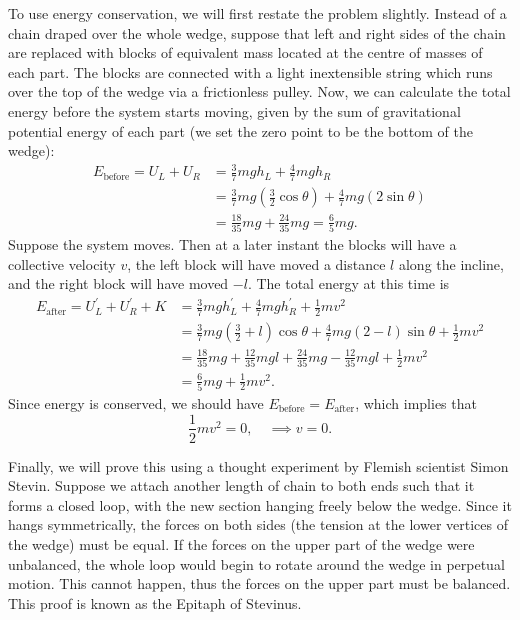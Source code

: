 \documentclass[../classical_mechanics.tex]{subfiles}
\begin{document}
\begin{example}
            To use energy conservation, we will first restate the problem slightly.
            Instead of a chain draped over the whole wedge, suppose that left and right sides of the chain are replaced with blocks of equivalent mass located at the centre of masses of each part.
            The blocks are connected with a light inextensible string which runs over the top of the wedge via a frictionless pulley.
            Now, we can calculate the total energy before the system starts moving, given by the sum of gravitational potential energy of each part (we set the zero point to be the bottom of the wedge):
            \begin{align}
                E_\text{before}=U_L+U_R&=\frac{3}{7}mgh_L+\frac{4}{7}mgh_R\\
                &=\frac{3}{7}mg(\frac{3}{2}\cos\theta)+\frac{4}{7}mg(2\sin\theta)\\
                &=\frac{18}{35}mg+\frac{24}{35}mg=\frac{6}{5}mg.
            \end{align}
            Suppose the system moves.
            Then at a later instant the blocks will have a collective velocity $v$, the left block will have moved a distance $l$ along the incline, and the right block will have moved $-l$.
            The total energy at this time is
            \begin{align}
                E_\text{after}=U_L^\prime+U_R^\prime+K&=\frac{3}{7}mgh_L^\prime+\frac{4}{7}mgh_R^\prime+\frac{1}{2}mv^2\\
                &=\frac{3}{7}mg\left(\frac{3}{2}+l\right)\cos\theta+\frac{4}{7}mg(2-l)\sin\theta+\frac{1}{2}mv^2\\
                &=\frac{18}{35}mg+\frac{12}{35}mgl+\frac{24}{35}mg-\frac{12}{35}mgl+\frac{1}{2}mv^2\\
                &=\frac{6}{5}mg+\frac{1}{2}mv^2.
            \end{align}
            Since energy is conserved, we should have $E_\text{before}=E_\text{after}$, which implies that
            \begin{equation}
                \frac{1}{2}mv^2=0,\quad\implies v=0.
            \end{equation}

            Finally, we will prove this using a thought experiment by Flemish scientist Simon Stevin.
            Suppose we attach another length of chain to both ends such that it forms a closed loop, with the new section hanging freely below the wedge.
            Since it hangs symmetrically, the forces on both sides (the tension at the lower vertices of the wedge) must be equal.
            If the forces on the upper part of the wedge were unbalanced, the whole loop would begin to rotate around the wedge in perpetual motion.
            This cannot happen, thus the forces on the upper part must be balanced.
            This proof is known as the Epitaph of Stevinus.
        \end{example}
\end{document}
